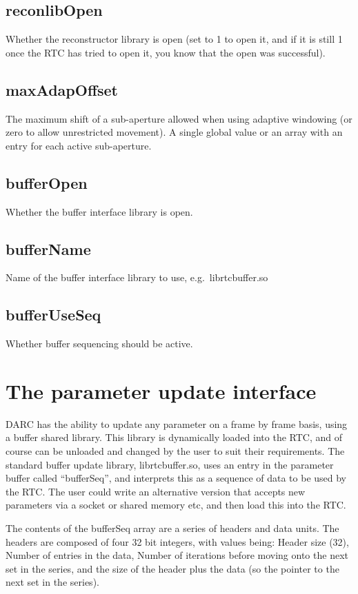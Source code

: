 \documentclass[a4,10pt]{article}
\begin{document}
\subsection{reconlibOpen}
Whether the reconstructor library is open (set to 1 to open it, and if
it is still 1 once the RTC has tried to open it, you know that the
open was successful).

\subsection{maxAdapOffset}
The maximum shift of a sub-aperture allowed when using adaptive
windowing (or zero to allow unrestricted movement).  A single global
value or an array with an entry for each active sub-aperture.

\subsection{bufferOpen}
Whether the buffer interface library is open.

\subsection{bufferName}
Name of the buffer interface library to use, e.g.\ librtcbuffer.so

\subsection{bufferUseSeq}
Whether buffer sequencing should be active.

\section{The parameter update interface}
DARC has the ability to update any parameter on a frame by frame
basis, using a buffer shared library.  This library is dynamically
loaded into the RTC, and of course can be unloaded and changed by the
user to suit their requirements.  The standard buffer update library,
librtcbuffer.so, uses an entry in the parameter buffer called
``bufferSeq'', and interprets this as a sequence of data to be used by
the RTC.  The user could write an alternative version that accepts new
parameters via a socket or shared memory etc, and then load this into
the RTC.

The contents of the bufferSeq array are a series of headers and data
units.  The headers are composed of four 32 bit integers, with values
being: Header size (32), Number of entries in the data, Number of
iterations before moving onto the next set in the series, and the size
of the header plus the data (so the pointer to the next set in the
series).
\end{document}
